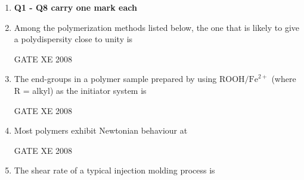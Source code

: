 \documentclass[12pt]{article}
\begin{document}
\begin{enumerate}
\item[] \textbf{Q1 - Q8 carry one mark each}

\item Among the polymerization methods listed below, the one that is likely to give a polydispersity close to unity is  

\begin{enumerate}
\end{enumerate}

 GATE XE 2008

\item The end-groups in a polymer sample prepared by using $\mathrm{ROOH}/\mathrm{Fe}^{2+}$ (where R = alkyl) as the initiator system is  

\begin{enumerate}
\end{enumerate}

 GATE XE 2008

\item Most polymers exhibit Newtonian behaviour at  

\begin{enumerate}
\end{enumerate}

GATE XE 2008

\item The shear rate of a typical injection molding process is  


\end{enumerate}
\end{document}
